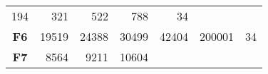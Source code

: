 \documentclass[12pt,a4paper]{article}
\begin{document}
\begin{longtable}[c]{@{}crrrrrr@{}}
\begin{minipage}[t]{0.08\columnwidth}
194
\strut\end{minipage} &
\begin{minipage}[t]{0.09\columnwidth}\raggedleft\strut
321
\strut\end{minipage} &
\begin{minipage}[t]{0.10\columnwidth}\raggedleft\strut
522
\strut\end{minipage} &
\begin{minipage}[t]{0.11\columnwidth}\raggedleft\strut
788
\strut\end{minipage} &
\begin{minipage}[t]{0.07\columnwidth}\raggedleft\strut
34
\strut\end{minipage}\tabularnewline
\begin{minipage}[t]{0.11\columnwidth}\centering\strut
\textbf{F6}
\strut\end{minipage} &
\begin{minipage}[t]{0.08\columnwidth}\raggedleft\strut
19519
\strut\end{minipage} &
\begin{minipage}[t]{0.08\columnwidth}\raggedleft\strut
24388
\strut\end{minipage} &
\begin{minipage}[t]{0.09\columnwidth}\raggedleft\strut
30499
\strut\end{minipage} &
\begin{minipage}[t]{0.10\columnwidth}\raggedleft\strut
42404
\strut\end{minipage} &
\begin{minipage}[t]{0.11\columnwidth}\raggedleft\strut
200001
\strut\end{minipage} &
\begin{minipage}[t]{0.07\columnwidth}\raggedleft\strut
34
\strut\end{minipage}\tabularnewline
\begin{minipage}[t]{0.11\columnwidth}\centering\strut
\textbf{F7}
\strut\end{minipage} &
\begin{minipage}[t]{0.08\columnwidth}\raggedleft\strut
8564
\strut\end{minipage} &
\begin{minipage}[t]{0.08\columnwidth}\raggedleft\strut
9211
\strut\end{minipage} &
\begin{minipage}[t]{0.09\columnwidth}\raggedleft\strut
10604
\strut\end{minipage} &
\begin{minipage}[t]{0.10\columnwidth}\raggedleft\strut

\end{minipage}
\end{longtable}
\end{document}
